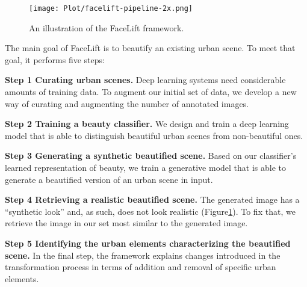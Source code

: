  \begin{figure}[ht]
	\centering
	\texttt{[image: Plot/facelift-pipeline-2x.png]}
	\caption{An illustration of the FaceLift framework.}
	\label{fig:framework}
\end{figure}

The main goal of FaceLift is to beautify an existing urban scene. To meet that goal, it performs five steps: 
\begin{description}
	\item \textbf{Step 1 Curating urban scenes.} Deep learning systems need considerable amounts of training data. To augment our initial set of data, we develop a new way of curating and augmenting the number of annotated images.  
	\item \textbf{Step 2 Training a beauty classifier.} We design and train a deep learning model that is able to distinguish beautiful urban scenes from non-beautiful ones. 
	\item \textbf{Step 3 Generating a synthetic beautified scene.} Based on our classifier's learned representation of beauty, we train a generative model that is able to generate a  beautified version 
of an urban scene in input. 
	\item \textbf{Step 4 Retrieving a realistic beautified scene.} The generated image has a ``synthetic look'' and, as such, does not look realistic (Figure\ref{fig:framework}). To fix that, we retrieve the image in our set  most similar to the generated image. 
	\item \textbf{Step 5 Identifying the urban elements characterizing the beautified scene.} In the final step, the framework explains changes introduced in the transformation process in terms of addition and removal of specific urban elements. 
\end{description}


